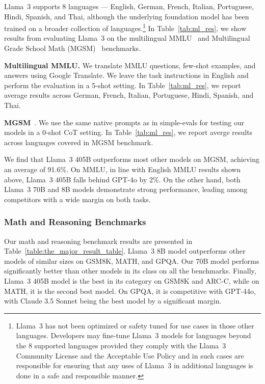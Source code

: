 Llama~3 supports 8 languages --- English, German, French, Italian, Portuguese, Hindi, Spanish, and Thai, although the underlying foundation model has been trained on a broader collection of languages.\footnote{Llama~3 has not been optimized or safety tuned for use cases in those other languages. Developers may fine-tune Llama~3 models for languages beyond the 8 supported languages provided they comply with the Llama~3 Community License and the Acceptable Use Policy and in such cases are responsible for ensuring that any uses of Llama~3 in additional languages is done in a safe and responsible manner.} In Table~\ref{tab:ml_res}, we show results from evaluating Llama~3 on the multilingual MMLU~\citep{hendrycks2021mmlu} and Multilingual Grade School Math (MGSM)~\citep{shi2022languagemodelsmultilingualchainofthought} benchmarks.

\textbf{Multilingual MMLU.} We translate MMLU questions, few-shot examples, and answers using Google Translate. We leave the task instructions in English and perform the evaluation in a 5-shot setting. In Table~\ref{tab:ml_res}, we report average results across German, French, Italian, Portuguese, Hindi, Spanish, and Thai.

\textbf{MGSM}~\citep{shi2022languagemodelsmultilingualchainofthought}.
We use the same native prompts as in simple-evals \citep{simpleevals} for testing our models in a 0-shot CoT setting. In Table~\ref{tab:ml_res}, we report averge results across languages covered in MGSM benchmark.

We find that Llama~3 405B outperforms most other models on MGSM, achieving an average of 91.6\%.
On MMLU, in line with English MMLU results shown above, Llama~3 405B falls behind GPT-4o by 2\%.
On the other hand, both Llama~3 70B and 8B models demonstrate strong performance, leading among competitors with a wide margin on both tasks.

\subsubsection{Math and Reasoning Benchmarks}
\label{subsubsec:reasoning_evals}

Our math and reasoning benchmark results are presented in Table~\ref{table:the_major_result_table}. Llama~3 8B model outperforms other models of similar sizes on GSM8K, MATH, and GPQA. Our 70B model performs significantly better than other models in its class on all the benchmarks. Finally, Llama~3 405B model is the best in its category on GSM8K and ARC-C, while on MATH, it is the second best model. On GPQA, it is competitive with GPT-44o, with Claude 3.5 Sonnet being the best model by a significant margin.

